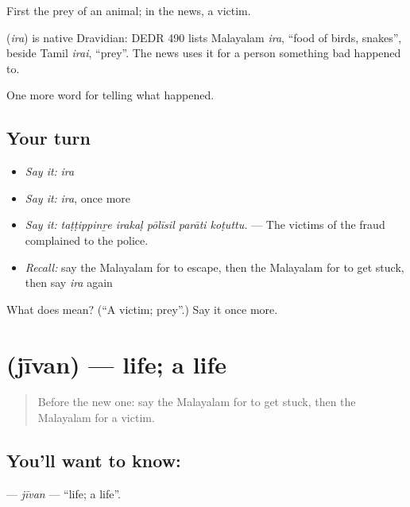 First the prey of an animal; in the news, a victim.

\begin{cousinweb}
\textbf{} (\emph{ira}) is native Dravidian: DEDR 490 lists Malayalam \emph{ira}, \textquotedblleft{}food of birds, snakes\textquotedblright{}, beside Tamil \emph{irai}, \textquotedblleft{}prey\textquotedblright{}. The news uses it for a person something bad happened to.
\end{cousinweb}

\begin{grammarlens}[title={What you've built}]
One more word for telling what happened.
\end{grammarlens}

\subsection*{Your turn}
\begin{itemize}
\raggedright
  \item \emph{Say it:} \emph{ira}
  \item \emph{Say it:} \emph{ira}, once more
  \item \emph{Say it:} \emph{taṭṭippinṟe irakaḷ pōlīsil parāti koṭuttu.} — The victims of the fraud complained to the police.
  \item \emph{Recall:} say the Malayalam for to escape, then the Malayalam for to get stuck, then say \emph{ira} again
\end{itemize}

\begin{tcolorbox}[breakable,colback=teal!4,colframe=teal!35!black,title={Before you move on}]
What does  mean? (\textquotedblleft{}A victim; prey\textquotedblright{}.) Say it once more.
\end{tcolorbox}
\section[\texorpdfstring{\ml{ജീവൻ} (jīvan)}{ജീവൻ (jīvan)}]{ (jīvan) — life; a life}

\label{lesson:ML-C376-jivan}



\begin{quote}
Before the new one: say the Malayalam for to get stuck, then the Malayalam for a victim.
\end{quote}

\subsection*{You'll want to know: }
\textbf{} — \emph{jīvan} — \textquotedblleft{}life; a life\textquotedblright{}.

